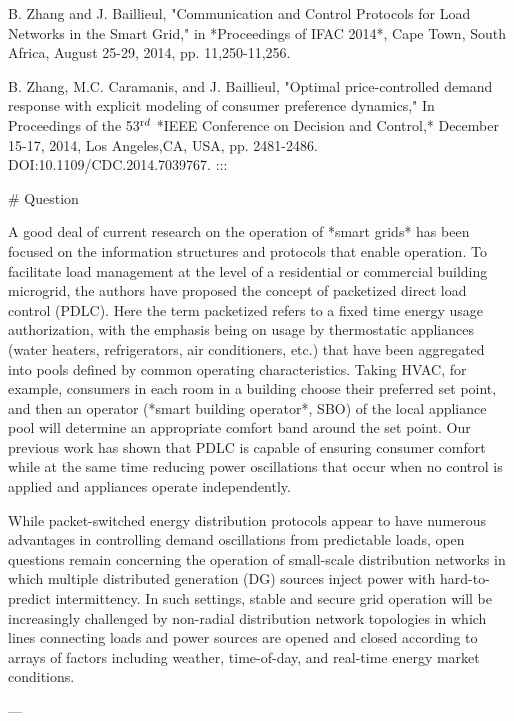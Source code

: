 B. Zhang and J. Baillieul, "Communication and Control Protocols for Load Networks in the Smart Grid," in *Proceedings of IFAC 2014*, Cape Town, South Africa, August 25-29, 2014, pp. 11,250-11,256.

B. Zhang, M.C. Caramanis, and J. Baillieul, "Optimal price-controlled demand response with explicit modeling of consumer preference dynamics," In Proceedings of the 53$^{\textrm rd}$ *IEEE Conference on Decision and Control,* December 15-17, 2014, Los Angeles,CA, USA, pp. 2481-2486. DOI:10.1109/CDC.2014.7039767. :::

# Question

A good deal of current research on the operation of *smart grids* has been focused on the information structures and protocols that enable operation. To facilitate load management at the level of a residential or commercial building microgrid, the authors have proposed the concept of packetized direct load control (PDLC). Here the term packetized refers to a fixed time energy usage authorization, with the emphasis being on usage by thermostatic appliances (water heaters, refrigerators, air conditioners, etc.) that have been aggregated into pools defined by common operating characteristics. Taking HVAC, for example, consumers in each room in a building choose their preferred set point, and then an operator (*smart building operator*, SBO) of the local appliance pool will determine an appropriate comfort band around the set point. Our previous work has shown that PDLC is capable of ensuring consumer comfort while at the same time reducing power oscillations that occur when no control is applied and appliances operate independently.

While packet-switched energy distribution protocols appear to have numerous advantages in controlling demand oscillations from predictable loads, open questions remain concerning the operation of small-scale distribution networks in which multiple distributed generation (DG) sources inject power with hard-to-predict intermittency. In such settings, stable and secure grid operation will be increasingly challenged by non-radial distribution network topologies in which lines connecting loads and power sources are opened and closed according to arrays of factors including weather, time-of-day, and real-time energy market conditions.

---

